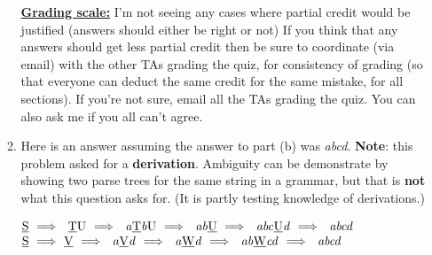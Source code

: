 \documentclass[11pt,fleqn]{article}
\begin{document}
\begin{enumerate}
\begin{enumerate}
\begin{info}{\textbf{\underline{Grading scale:}}}
                    I'm not seeing any cases where partial credit would be
                    justified (answers should either be right or not) If you
                    think that any answers should get less partial credit
                    then be sure to coordinate (via email) with the other
                    TAs grading the quiz, for consistency of grading (so
                    that everyone can deduct the same credit for the same
                    mistake, for all sections).  If you're not sure, email
                    all the TAs grading the quiz.  You can also ask me if
                    you all can't agree.

                  \end{info}

            \item Here is an answer assuming the answer to part (b) was
                  \emph{abcd}.  \textbf{Note}: this problem asked for a
                  \textbf{derivation}.  Ambiguity can be demonstrate by
                  showing two parse trees for the same string in a
                  grammar, but that is \textbf{not} what this question asks
                  for.  (It is partly testing knowledge of derivations.)

                  \begin{center}

                    \renewcommand{\arraystretch}{2}

                    \(
                      \begin{array}[t]{@{}l}
                      \mathrm{\underline{S} \
                              \Longrightarrow\ \
                              \underline{T}U \
                              \Longrightarrow\ \
                              \mathit{a}\underline{T}\mathit{b}U \
                              \Longrightarrow\ \
                              \mathit{ab}\underline{U} \
                              \Longrightarrow\ \
                              \mathit{abc}\underline{U}\mathit{d} \
                              \Longrightarrow\ \
                              \mathit{abcd}}
                        \\
                      \mathrm{\underline{S} \
                              \Longrightarrow\ \underline{V} \
                              \Longrightarrow\ \
                              \mathit{a}\underline{V}\mathit{d} \
                              \Longrightarrow\ \
                              \mathit{a}\underline{W}\mathit{d} \
                              \Longrightarrow\ \
                              \mathit{ab}\underline{W}\mathit{cd} \
                              \Longrightarrow\ \
                              \mathit{abcd}}
                        \\
                      \end{array}
                    \)


\end{center}
\end{enumerate}
\end{enumerate}
\end{document}
